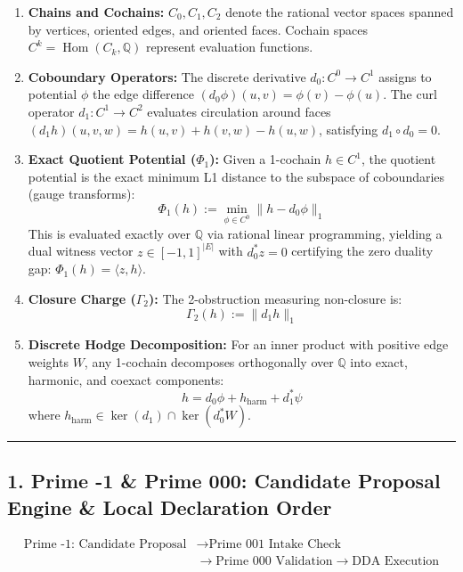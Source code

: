 \documentclass[
  11pt,
]{article}
\providecommand{\tightlist}{%
  \setlength{\itemsep}{0pt}\setlength{\parskip}{0pt}}
\renewcommand{\_}{\origunderscore\allowbreak}
\begin{document}
\begin{enumerate}
\def\labelenumi{\arabic{enumi}.}
\tightlist
\item
  \textbf{Chains and Cochains:} \(C_0, C_1, C_2\) denote the rational
  vector spaces spanned by vertices, oriented edges, and oriented faces.
  Cochain spaces \(C^k = \operatorname{Hom}(C_k, \mathbb{Q})\) represent
  evaluation functions.
\item
  \textbf{Coboundary Operators:} The discrete derivative
  \(d_0: C^0 \to C^1\) assigns to potential \(\phi\) the edge difference
  \((d_0 \phi)(u, v) = \phi(v) - \phi(u)\). The curl operator
  \(d_1: C^1 \to C^2\) evaluates circulation around faces
  \((d_1 h)(u, v, w) = h(u, v) + h(v, w) - h(u, w)\), satisfying
  \(d_1 \circ d_0 = 0\).
\item
  \textbf{Exact Quotient Potential (\(\Phi_1\)):} Given a 1-cochain
  \(h \in C^1\), the quotient potential is the exact minimum L1 distance
  to the subspace of coboundaries (gauge transforms):
  \[\Phi_1(h) := \min_{\phi \in C^0} \|h - d_0 \phi\|_1\] This is
  evaluated exactly over \(\mathbb{Q}\) via rational linear programming,
  yielding a dual witness vector \(z \in [-1, 1]^{|E|}\) with
  \(d_0^* z = 0\) certifying the zero duality gap:
  \(\Phi_1(h) = \langle z, h \rangle\).
\item
  \textbf{Closure Charge (\(\Gamma_2\)):} The 2-obstruction measuring
  non-closure is: \[\Gamma_2(h) := \|d_1 h\|_1\]
\item
  \textbf{Discrete Hodge Decomposition:} For an inner product with
  positive edge weights \(W\), any 1-cochain decomposes orthogonally
  over \(\mathbb{Q}\) into exact, harmonic, and coexact components:
  \[h = d_0 \phi + h_{\text{harm}} + d_1^* \psi\] where
  \(h_{\text{harm}} \in \ker(d_1) \cap \ker(d_0^* W)\).
\end{enumerate}

\begin{center}\rule{0.5\linewidth}{0.5pt}\end{center}

\subsection{1. Prime -1 \& Prime 000: Candidate Proposal Engine \& Local
Declaration
Order}\label{prime--1-prime-000-candidate-proposal-engine-local-declaration-order}

\[\begin{aligned}
\text{Prime -1: Candidate Proposal} &\longrightarrow \text{Prime 001 Intake Check} \\
&\longrightarrow \text{Prime 000 Validation} \longrightarrow \text{DDA Execution}
\end{aligned}\]
\end{document}
